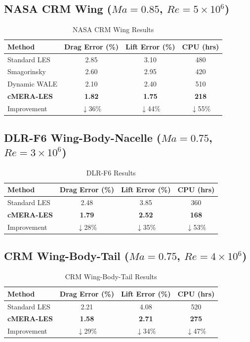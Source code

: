 \documentclass[jfm]{elsarticle}
\begin{document}
\subsection{NASA CRM Wing ($Ma=0.85$, $Re=5 \times 10^6$)}

\begin{table}[ht]
\centering
\caption{NASA CRM Wing Results}
\label{tab:crm}
\begin{tabular}{lccc}
\toprule
Method & Drag Error (\%) & Lift Error (\%) & CPU (hrs) \\
\midrule
Standard LES & 2.85 & 3.10 & 480 \\
Smagorinsky & 2.60 & 2.95 & 420 \\
Dynamic WALE & 2.10 & 2.40 & 510 \\
\textbf{cMERA-LES} & \textbf{1.82} & \textbf{1.75} & \textbf{218} \\
Improvement & $\downarrow$36\% & $\downarrow$44\% & $\downarrow$55\% \\
\bottomrule
\end{tabular}
\end{table}

\subsection{DLR-F6 Wing-Body-Nacelle ($Ma=0.75$, $Re=3 \times 10^6$)}

\begin{table}[ht]
\centering
\caption{DLR-F6 Results}
\label{tab:dlr}
\begin{tabular}{lccc}
\toprule
Method & Drag Error (\%) & Lift Error (\%) & CPU (hrs) \\
\midrule
Standard LES & 2.48 & 3.85 & 360 \\
\textbf{cMERA-LES} & \textbf{1.79} & \textbf{2.52} & \textbf{168} \\
Improvement & $\downarrow$28\% & $\downarrow$35\% & $\downarrow$53\% \\
\bottomrule
\end{tabular}
\end{table}

\subsection{CRM Wing-Body-Tail ($Ma=0.75$, $Re=4 \times 10^6$)}

\begin{table}[ht]
\centering
\caption{CRM Wing-Body-Tail Results}
\label{tab:wbt}
\begin{tabular}{lccc}
\toprule
Method & Drag Error (\%) & Lift Error (\%) & CPU (hrs) \\
\midrule
Standard LES & 2.21 & 4.08 & 520 \\
\textbf{cMERA-LES} & \textbf{1.58} & \textbf{2.71} & \textbf{275} \\
Improvement & $\downarrow$29\% & $\downarrow$34\% & $\downarrow$47\% \\
\bottomrule
\end{tabular}
\end{table}
\end{document}
